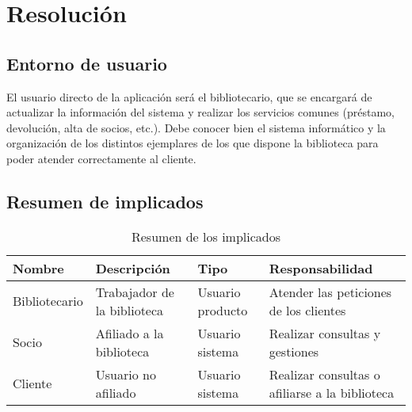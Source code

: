 \documentclass[12pt,spanish]{article}
\begin{document}
\section{Resolución}
\subsection{Entorno de usuario}
 El usuario directo de la aplicación será el bibliotecario, que se encargará de actualizar la información del sistema y realizar los servicios comunes (préstamo, devolución, alta de socios, etc.). Debe conocer bien el sistema informático y la organización de los distintos ejemplares de los que dispone la biblioteca para poder atender correctamente al cliente.
\subsection{Resumen de implicados} 
\begin{table}[H]
\begin{center}
\begin{tabular}{|l|p{4cm}|p{2cm}|p{4cm}|}
\hline
\textbf{Nombre} & \textbf{Descripción} & \textbf{Tipo} & \textbf{Responsabilidad} \\
\hline
Bibliotecario & Trabajador de la biblioteca & Usuario producto & Atender las peticiones de los clientes \\
\hline
Socio & Afiliado a la biblioteca & Usuario sistema & Realizar consultas y gestiones \\
\hline
Cliente & Usuario no afiliado & Usuario sistema & Realizar consultas o afiliarse a la biblioteca \\
\hline
\end{tabular}
\caption{Resumen de los implicados}
\end{center}
\end{table}
\end{document}
